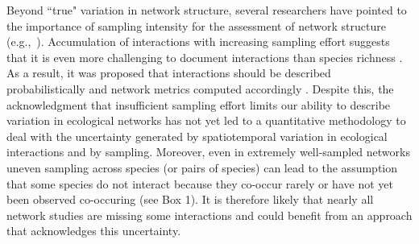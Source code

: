\documentclass[12pt]{article}
\begin{document}
    Beyond ``true" variation in network structure, several researchers have pointed to the importance of sampling intensity for the assessment of network structure (e.g.,~\citealp{Martinez1999,Bluthgen2006,XX}). Accumulation of interactions with increasing sampling effort suggests that it is even more challenging to document interactions than species richness \citep{Poisot2012}. As a result, it was proposed that interactions should be described probabilistically and network metrics computed accordingly \citep{Poisot2016}. Despite this, the acknowledgment that insufficient sampling effort limits our ability to describe variation in ecological networks has not yet led to a quantitative methodology to deal with the uncertainty generated by spatiotemporal variation in ecological interactions and by sampling. Moreover, even in extremely well-sampled networks uneven sampling across species (or pairs of species) can lead to the assumption that some species do not interact because they co-occur rarely or have not yet been observed co-occuring (see Box 1). It is therefore likely that nearly all network studies are missing some interactions and could benefit from an approach that acknowledges this uncertainty.
\end{document}
